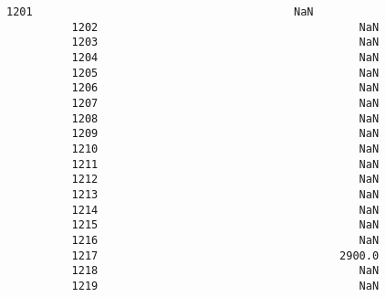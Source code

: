 \documentclass[11pt]{article}
\begin{document}
\begin{Verbatim}[commandchars=\\\{\}]
          1201                                        NaN   
          1202                                        NaN   
          1203                                        NaN   
          1204                                        NaN   
          1205                                        NaN   
          1206                                        NaN   
          1207                                        NaN   
          1208                                        NaN   
          1209                                        NaN   
          1210                                        NaN   
          1211                                        NaN   
          1212                                        NaN   
          1213                                        NaN   
          1214                                        NaN   
          1215                                        NaN   
          1216                                        NaN   
          1217                                     2900.0   
          1218                                        NaN   
          1219                                        NaN   
          

\end{Verbatim}
\end{document}
